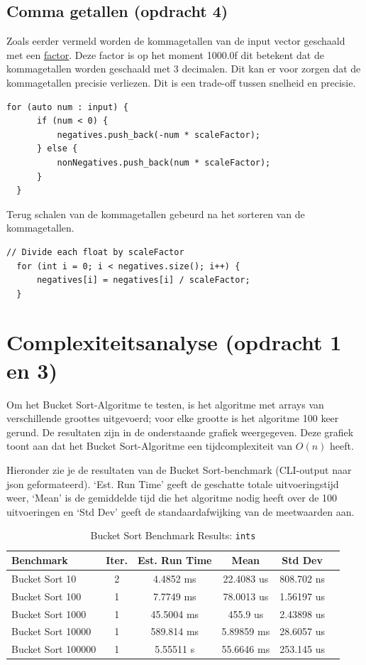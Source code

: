 \documentclass{article}
\begin{document}
\subsection{Comma getallen (opdracht 4)}
Zoals eerder vermeld worden de kommagetallen van de input vector geschaald met een \hyperref[lst:negatives]{factor}. 
Deze factor is op het moment 1000.0f dit betekent dat de kommagetallen worden geschaald met 3 decimalen. 
Dit kan er voor zorgen dat de kommagetallen precisie verliezen. Dit is een trade-off tussen snelheid en precisie.
\begin{lstlisting}[caption={Schaal factor}, label={lst:factor}]
  for (auto num : input) {
      if (num < 0) {
          negatives.push_back(-num * scaleFactor);
      } else {
          nonNegatives.push_back(num * scaleFactor);
      }
  }
\end{lstlisting}
Terug schalen van de kommagetallen gebeurd na het sorteren van de kommagetallen.
\begin{lstlisting}[caption={Terug schalen}, label={lst:factor}]
  // Divide each float by scaleFactor
  for (int i = 0; i < negatives.size(); i++) {
      negatives[i] = negatives[i] / scaleFactor;
  }
\end{lstlisting}


\newpage
\section{Complexiteitsanalyse (opdracht 1 en 3)}
Om het Bucket Sort-Algoritme te testen, is het algoritme met arrays van verschillende groottes uitgevoerd; voor elke grootte is het algoritme 100 keer gerund.  
De resultaten zijn in de onderstaande grafiek weergegeven. Deze grafiek toont aan dat het Bucket Sort-Algoritme een tijdcomplexiteit van \(O(n)\) heeft.

Hieronder zie je de resultaten van de Bucket Sort-benchmark (CLI-output naar json geformateerd). 
‘Est. Run Time’ geeft de geschatte totale uitvoeringstijd weer, 
‘Mean’ is de gemiddelde tijd die het algoritme nodig heeft over de 100 uitvoeringen en ‘Std Dev’ geeft de standaardafwijking van de meetwaarden aan.

\begin{table}[H]
  \caption{Bucket Sort Benchmark Results: \texttt{ints}\label{tab:ints-detailed}}
  \begin{tabular*}{\columnwidth}{@{\extracolsep\fill}lccccc}
    \hline
    Benchmark  & Iter. & Est. Run Time & Mean          & Std Dev       \\
    \hline
    Bucket Sort 10     & 2 & 4.4852 ms  & 22.4083 us  & 808.702 ns  \\
    Bucket Sort 100    & 1 & 7.7749 ms  & 78.0013 us  & 1.56197 us  \\
    Bucket Sort 1000   & 1 & 45.5004 ms & 455.9 us    & 2.43898 us  \\
    Bucket Sort 10000  & 1 & 589.814 ms & 5.89859 ms  & 28.6057 us  \\
    Bucket Sort 100000 & 1 & 5.55511 s  & 55.6646 ms  & 253.145 us  \\
    \hline
  \end{tabular*}
\end{table}
\end{document}
